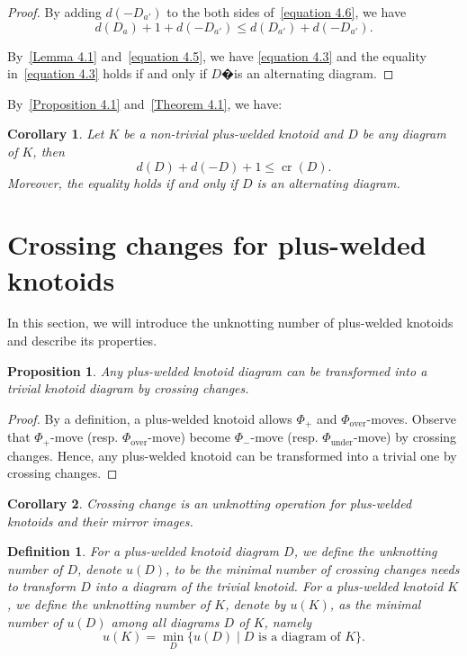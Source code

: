 \documentclass[11pt]{amsart}
\theoremstyle{noparens}
\newtheorem{corollary}{Corollary}[section]
\newtheorem{proposition}{Proposition}[section]
\newtheorem{definition}{Definition}[section]
\numberwithin{equation}{section}
\numberwithin{equation}{section}
\begin{document}
\begin{proof}
By adding $d(-D_{a'})$ to the both sides of~\cref{equation 4.6}, we have
$$
d(D_a)+1 + d(-D_{a'})\leq d(D_{a'})+d(-D_{a'}).
$$
	
By~\cref{Lemma 4.1} and~\cref{equation 4.5}, we have \cref{equation 4.3}
and the equality in~\cref{equation 4.3} holds if and only if $D$�is an alternating diagram.
\end{proof}

By~\cref{Proposition 4.1} and~\cref{Theorem 4.1}, we have: 
 
\begin{corollary}
	\label{corollary 4.3}
Let $K$ be a non-trivial plus-welded knotoid and $D$ be any diagram of $K$, then 
\begin{equation} \label{equation 4.7}
		d(D) + d(-D) + 1 \leq \operatorname{cr}(D).
\end{equation}
Moreover, the equality holds if and only if $D$ is an alternating diagram. 
\end{corollary}


\section{Crossing changes for plus-welded knotoids} \label{section5}

In this section, we will introduce the unknotting number of plus-welded knotoids and describe its properties. 

\begin{proposition} \label{Proposition 5.1}
Any plus-welded knotoid diagram can be transformed into a trivial knotoid diagram by crossing changes.
\end{proposition} 

\begin{proof}
By a definition, a plus-welded knotoid allows $\Phi_+$ and $\Phi_{\text{over}}$-moves.
Observe that $\Phi_+$-move (resp. $\Phi_{\text{over}}$-move) become $\Phi_-$-move (resp.  $\Phi_{\text{under}}$-move) by crossing changes.
Hence, any plus-welded knotoid can be transformed into a trivial one by crossing changes.
\end{proof}

\begin{corollary}
Crossing change is an unknotting operation for plus-welded knotoids and their mirror images. 
\end{corollary}

\begin{definition} \label{Definition 5.1}
\rm{
For a plus-welded knotoid diagram $D$, we define the \textit{unknotting number} of $D$, denote $u(D)$, to be the minimal number of crossing changes needs to transform $D$ into a diagram of the trivial knotoid. For a plus-welded knotoid $K$, we define the \textit{unknotting number} of $K$, denote by $u(K)$, as the minimal number of $u(D)$ among all diagrams $D$ of $K$, namely 
$$
u(K) = \min_{D} \{ u(D) \mid \text{$D$ is a diagram} \text{ of $K$}\}.
$$
}
\end{definition}
\end{document}

